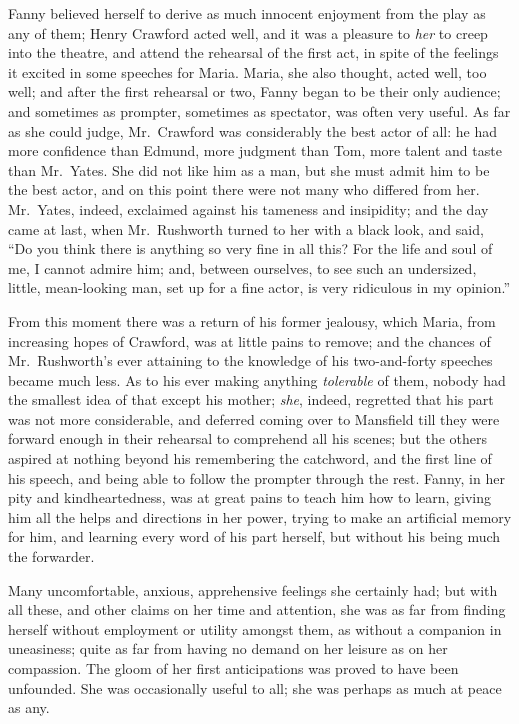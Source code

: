 \documentclass{article}
\begin{document}
Fanny believed herself to derive as much innocent enjoyment
from the play as any of them; Henry Crawford acted well,
and it was a pleasure to \emph{her} to creep into the theatre,
and attend the rehearsal of the first act, in spite of the
feelings it excited in some speeches for Maria.  Maria, she
also thought, acted well, too well; and after the first
rehearsal or two, Fanny began to be their only audience;
and sometimes as prompter, sometimes as spectator,
was often very useful.  As far as she could judge,
Mr.\ Crawford was considerably the best actor of all:
he had more confidence than Edmund, more judgment than Tom,
more talent and taste than Mr.\ Yates.  She did not like him
as a man, but she must admit him to be the best actor,
and on this point there were not many who differed from her.
Mr.\ Yates, indeed, exclaimed against his tameness
and insipidity; and the day came at last, when Mr.\ Rushworth
turned to her with a black look, and said, ``Do you think
there is anything so very fine in all this?  For the life
and soul of me, I cannot admire him; and, between ourselves,
to see such an undersized, little, mean-looking man,
set up for a fine actor, is very ridiculous in my opinion.''

From this moment there was a return of his former jealousy,
which Maria, from increasing hopes of Crawford, was at
little pains to remove; and the chances of Mr.\ Rushworth's
ever attaining to the knowledge of his two-and-forty
speeches became much less.  As to his ever making anything
\emph{tolerable} of them, nobody had the smallest idea of that
except his mother; \emph{she}, indeed, regretted that his part
was not more considerable, and deferred coming over to
Mansfield till they were forward enough in their rehearsal
to comprehend all his scenes; but the others aspired at
nothing beyond his remembering the catchword, and the first
line of his speech, and being able to follow the prompter
through the rest.  Fanny, in her pity and kindheartedness,
was at great pains to teach him how to learn, giving him
all the helps and directions in her power, trying to make
an artificial memory for him, and learning every word
of his part herself, but without his being much the forwarder.

Many uncomfortable, anxious, apprehensive feelings she
certainly had; but with all these, and other claims
on her time and attention, she was as far from finding
herself without employment or utility amongst them,
as without a companion in uneasiness; quite as far from
having no demand on her leisure as on her compassion.
The gloom of her first anticipations was proved to have
been unfounded.  She was occasionally useful to all;
she was perhaps as much at peace as any.
\end{document}
